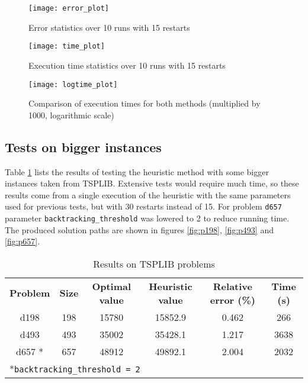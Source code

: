 

\begin{figure}[H]
	\centering
	\texttt{[image: error\_plot]}
	\caption{Error statistics over 10 runs with 15 restarts}
	\label{fig:ploterr}
\end{figure}

\begin{figure}[H]
	\centering
	\texttt{[image: time\_plot]}
	\caption{Execution time statistics over 10 runs with 15 restarts}
	\label{fig:plotime}
\end{figure}

\begin{figure}[H]
	\centering
	\texttt{[image: logtime\_plot]}
	\caption{Comparison of execution times for both methods (multiplied by 1000, logarithmic scale)}
	\label{fig:logtime}
\end{figure}

\subsection{Tests on bigger instances}
Table \ref{tab:tsplibr} lists the results of testing the heuristic method with some bigger instances taken from TSPLIB. Extensive tests would require much time, so these results come from a single execution of the heuristic with the same parameters used for previous tests, but with 30 restarts instead of 15. For problem \texttt{d657} parameter \texttt{backtracking\_threshold} was lowered to 2 to reduce running time.  The produced solution paths are shown in figures \ref{fig:p198}, \ref{fig:p493} and \ref{fig:p657}.

\begin{table}[h]
	\caption{Results on TSPLIB problems}
	\label{tab:tsplibr}
	\centering
	\begin{tabular}[t]{cccccc}
		\rowcolor[HTML]{EFEFEF}
		\textbf{Problem} & \textbf{Size} & \textbf{Optimal value} & \textbf{Heuristic value} & \textbf{Relative error (\%)} & \textbf{Time (s)} \\
		d198    & 198 & 15780 & 15852.9 & 0.462  & 266   \\
		d493    & 493 & 35002 & 35428.1 & 1.217 & 3638	\\
		d657 *	& 657 & 48912 & 49892.1 & 2.004	&  2032 \\
		\multicolumn{6}{l}{\rule{0pt}{4ex}*\texttt{backtracking\_threshold = 2}} 
	\end{tabular}
\end{table}

